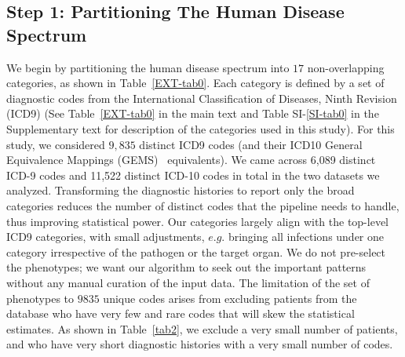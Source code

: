 \documentclass[onecolumn,10pt]{IEEEtran}
\begin{document}
\subsection*{Step 1: Partitioning The Human Disease Spectrum} We begin by partitioning the human disease spectrum into  $17$ non-overlapping  categories,  as shown in Table~\ref{EXT-tab0}. Each category is defined by a set of diagnostic codes from the International Classification of Diseases, Ninth Revision (ICD9) (See Table~\ref{EXT-tab0} in the main text  and Table SI-\ref{SI-tab0} in the Supplementary text for description of  the categories used in this study).
For this study, we considered $9,835$ distinct ICD9 codes (and their ICD10 General Equivalence Mappings (GEMS)~\cite{GEMS} equivalents). We came across 6,089 distinct ICD-9 codes and 11,522 distinct ICD-10 codes in total in the two datasets we analyzed. Transforming the diagnostic histories to report only the broad categories   reduces the number of distinct codes that the pipeline needs to handle, thus improving statistical  power.  %
% 
Our categories largely align with the top-level ICD9 categories, with small 
adjustments, $e.g.$ bringing all infections under one category irrespective of the pathogen or the target organ.
We do not pre-select the phenotypes; we want our algorithm to seek out the important patterns without any manual curation of the input data. The limitation of the set of phenotypes to $9835$ unique codes arises from excluding patients from the database who have very few and rare codes that will skew the statistical estimates. As shown in Table~\ref{tab2}, we exclude a very small number of patients, and who have  very short diagnostic histories with a very small number of codes.
\end{document}

